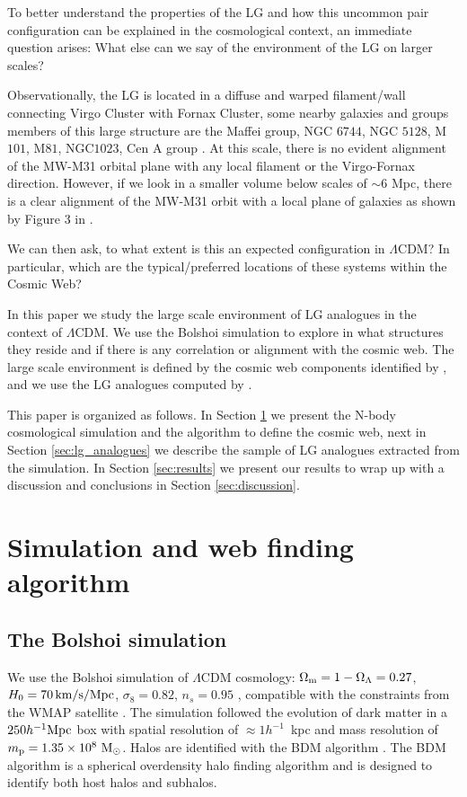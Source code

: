 \documentclass{emulateapj}
\newcommand{\manuscript}{paper }
\newcommand{\mpc}{\rm{Mpc}}
\newcommand{\hmpc}{{\ifmmode{h^{-1}{\rm Mpc}}\else{$h^{-1}$Mpc }\fi}}
\begin{document}
To better understand the properties of the LG and how this uncommon
pair configuration can be explained in the cosmological context, 
an immediate question arises: 
What else can we say of the environment of the LG on larger scales?

Observationally, the LG is located in a diffuse and
warped filament/wall connecting Virgo Cluster with Fornax Cluster, some
nearby galaxies and groups members of this large structure are the
Maffei group, NGC $6744$, NGC $5128$, M$101$, M$81$, NGC$1023$, Cen A
group \citep{2013AJ....146...69C}.
At this scale, there is no evident alignment of the MW-M31 orbital
plane with any local filament or the Virgo-Fornax direction. However,
if we look in a smaller volume below scales of $\sim 6$ \mpc, there is
a clear alignment of the MW-M31 orbit with a local plane of galaxies
as shown by Figure $3$ in \citet{2013AJ....146...69C}.   


We can then ask, to what extent is this an expected configuration in
$\Lambda$CDM? In particular, which are the typical/preferred locations
of these systems within the Cosmic Web? 


In this \manuscript we study the large scale environment of LG 
analogues in the context of $\Lambda$CDM. 
We use the Bolshoi simulation to explore in what structures they
reside and if there is any correlation or alignment with the cosmic
web. 
The large scale environment is defined by the cosmic web components identified by
\citet{Tweb}, and we use the LG analogues computed by
\citet{lganalogues}. 

   
This \manuscript is organized as follows. 
In Section \ref{sec:simulation}
we present the N-body cosmological simulation and the algorithm to
define the cosmic web, next in Section \ref{sec:lg_analogues} we describe the
sample of LG analogues extracted from the simulation. In
Section \ref{sec:results} we present our results to wrap up with a
discussion and conclusions in Section
\ref{sec:discussion}.



\section{Simulation and web finding algorithm}
\label{sec:simulation}

\subsection{The Bolshoi simulation}
We use the Bolshoi simulation of $\Lambda$CDM cosmology: $\Omega_{\rm
  m}=1-\Omega_{\Lambda}=0.27$, $H_0=70\,\rm km/s/Mpc$,
$\sigma_8=0.82$, $n_s=0.95$ \citep{2011ApJ...740..102K}, compatible
with the constraints from the WMAP satellite
\citep{hinshaw_etal13}. The simulation followed the evolution of dark
matter in a $250 \hmpc$ box with spatial resolution of $\approx
1h^{-1}$~kpc and mass resolution of $m_{\rm p}=1.35\times 10^8\ \rm
M_{\odot}$. Halos are identified with the BDM algorithm
\citep{1997astro.ph.12217K}. The BDM algorithm is  a spherical
overdensity halo finding algorithm and is designed to identify both
host halos and subhalos. 
\end{document}
